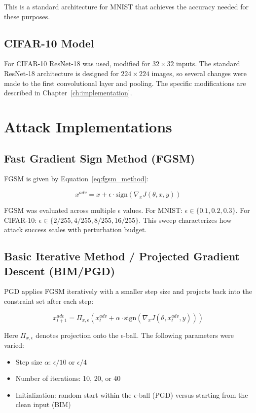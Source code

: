 This is a standard architecture for MNIST that achieves the accuracy needed for these purposes.

\subsection{CIFAR-10 Model}

For CIFAR-10 ResNet-18 was used, modified for $32 \times 32$ inputs. The standard ResNet-18 architecture is designed for $224 \times 224$ images, so several changes were made to the first convolutional layer and pooling. The specific modifications are described in Chapter~\ref{ch:implementation}.

\section{Attack Implementations}

\subsection{Fast Gradient Sign Method (FGSM)}

FGSM is given by Equation~\ref{eq:fgsm_method}:

\begin{equation}
    x^{adv} = x + \epsilon \cdot \text{sign}(\nabla_x J(\theta, x, y))
    \label{eq:fgsm_method}
\end{equation}

FGSM was evaluated across multiple $\epsilon$ values. For MNIST: $\epsilon \in \{0.1, 0.2, 0.3\}$. For CIFAR-10: $\epsilon \in \{2/255, 4/255, 8/255, 16/255\}$. This sweep characterizes how attack success scales with perturbation budget.

\subsection{Basic Iterative Method / Projected Gradient Descent (BIM/PGD)}

PGD applies FGSM iteratively with a smaller step size and projects back into the constraint set after each step:

\begin{equation}
    x^{adv}_{t+1} = \Pi_{x,\epsilon}\left(x^{adv}_t + \alpha \cdot \text{sign}(\nabla_x J(\theta, x^{adv}_t, y))\right)
    \label{eq:pgd_method}
\end{equation}

Here $\Pi_{x,\epsilon}$ denotes projection onto the $\epsilon$-ball. The following parameters were varied:
\begin{itemize}
    \item Step size $\alpha$: $\epsilon/10$ or $\epsilon/4$
    \item Number of iterations: 10, 20, or 40
    \item Initialization: random start within the $\epsilon$-ball (PGD) versus starting from the clean input (BIM)
\end{itemize}

